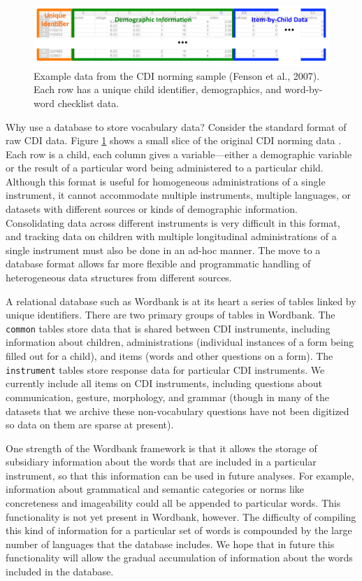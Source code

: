 \documentclass[man,noapacite]{apa}
\begin{document}
\begin{figure}[t]
\centering
\includegraphics[width=5in]{figures/itembychild.pdf}
\caption{\label{fig:data} Example data from the CDI norming sample (Fenson et al., 2007). Each row has a unique child identifier, demographics, and word-by-word checklist data. }
\end{figure}

Why use a database to store vocabulary data? Consider the standard format of raw CDI data. Figure \ref{fig:data} shows a small slice of the original CDI norming data \cite{fenson1994,fenson2007}. Each row is a child, each column gives a variable---either a demographic variable or the result of a particular word being administered to a particular child. Although this format is useful for homogeneous administrations of a single instrument, it cannot accommodate multiple instruments, multiple languages, or datasets with different sources or kinds of demographic information. Consolidating data across different instruments is very difficult in this format, and tracking data on children with multiple longitudinal administrations of a single instrument must also be done in an ad-hoc manner. The move to a database format allows far more flexible and programmatic handling of heterogeneous data structures from different sources. 

A relational database such as Wordbank is at its heart a series of tables linked by unique identifiers. There are two primary groups of tables in Wordbank. The \texttt{common} tables store data that is shared between CDI instruments, including information about children, administrations (individual instances of a form being filled out for a child), and items (words and other questions on a form). The \texttt{instrument} tables store response data for particular CDI instruments. We currently include all items on CDI instruments, including questions about communication, gesture, morphology, and grammar (though in many of the datasets that we archive these non-vocabulary questions have not been digitized so data on them are sparse at present). 

One strength of the Wordbank framework is that it allows the storage of subsidiary information about the words that are included in a particular instrument, so that this information can be used in future analyses. For example, information about grammatical and semantic categories or norms like concreteness and imageability could all be appended to particular words. This functionality is not yet present in Wordbank, however. The difficulty of compiling this kind of information for a particular set of words is compounded by the large number of languages that the database includes. We hope that in future this functionality will allow the gradual accumulation of information about the words included in the database.
\end{document}
